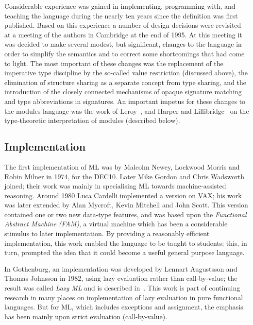 Considerable experience was gained in implementing, programming with, and
teaching the language during the nearly ten years since the definition was
first published.  Based on this experience a number of design decisions were
revisited at a meeting of the authors in Cambridge at the end of 1995.  At
this meeting it was decided to make several modest, but significant, changes
to the language in order to simplify the semantics and to correct some
shortcomings that had come to light.  The most important of these changes was
the replacement of the imperative type discipline by the so-called value
restriction (discussed above), the elimination of structure sharing as a
separate concept from type sharing, and the introduction of the closely
connected mechanisms of opaque signature matching and type abbreviations in
signatures.  An important impetus for these changes to the modules language
was the work of Leroy~\cite{leroy94}, and Harper and
Lillibridge~\cite{HL} on the type-theoretic interpretation of
modules (described below).

\subsection*{Implementation}

The first implementation of ML was by Malcolm Newey, Lockwood Morris and Robin
Milner in 1974, for the DEC10.  Later Mike Gordon and Chris Wadsworth joined;
their work was mainly in specialising ML towards machine-assisted reasoning.
Around 1980 Luca Cardelli implemented a version on VAX; his work was later
extended by Alan Mycroft, Kevin Mitchell and John Scott.  This version
contained one or two new data-type features, and was based upon the {\em
Functional Abstract Machine (FAM)}, a virtual machine which has been a
considerable stimulus to later implementation.  By providing a reasonably
efficient implementation, this work enabled the language to be taught to
students; this, in turn, prompted the idea that it could become a useful
general purpose language.

In Gothenburg, an implementation was developed by Lennart Augustsson and
Thomas Johnsson in 1982, using lazy evaluation rather than call-by-value; the
result was called {\em Lazy ML} and is described in~\cite{Aug}.  This work is
part of continuing research in many places on implementation of lazy
evaluation in pure functional languages.  But for ML, which includes
exceptions and assignment, the emphasis has been mainly upon strict evaluation
(call-by-value).

